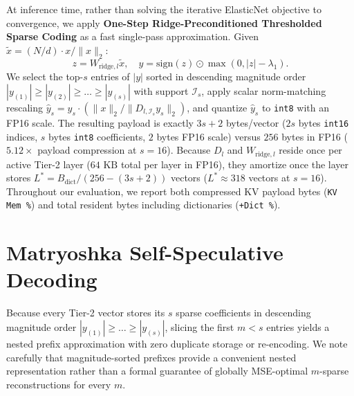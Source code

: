 \documentclass[conference]{IEEEtran}
\begin{document}
At inference time, rather than solving the iterative ElasticNet objective to convergence, we apply \textbf{One-Step Ridge-Preconditioned Thresholded Sparse Coding} as a fast single-pass approximation. Given $\tilde{x} = (N / d)\cdot x / \|x\|_2$:
\begin{equation}
z = W_{\text{ridge}, l}\tilde{x}, \quad y = \text{sign}(z) \odot \max\!\left(0, |z| - \lambda_1\right).
\label{eq:one_step_codec}
\end{equation}
We select the top-$s$ entries of $|y|$ sorted in descending magnitude order $|y_{(1)}| \ge |y_{(2)}| \ge \dots \ge |y_{(s)}|$ with support $\mathcal{I}_s$, apply scalar norm-matching rescaling $\hat{y}_s = y_s \cdot (\|x\|_2 / \|D_{l,\mathcal{I}_s} y_s\|_2)$, and quantize $\hat{y}_s$ to \texttt{int8} with an FP16 scale. The resulting payload is exactly $3s + 2$ bytes/vector ($2s$ bytes \texttt{int16} indices, $s$ bytes \texttt{int8} coefficients, $2$ bytes FP16 scale) versus $256$ bytes in FP16 ($5.12\times$ payload compression at $s = 16$). Because $D_l$ and $W_{\text{ridge},l}$ reside once per active Tier-2 layer ($64\text{ KB}$ total per layer in FP16), they amortize once the layer stores $L^* = B_{\text{dict}} / (256 - (3s + 2))$ vectors ($L^* \approx 318$ vectors at $s = 16$). Throughout our evaluation, we report both compressed KV payload bytes (\texttt{KV Mem \%}) and total resident bytes including dictionaries (\texttt{+Dict \%}).

\section{Matryoshka Self-Speculative Decoding}
Because every Tier-2 vector stores its $s$ sparse coefficients in descending magnitude order $|y_{(1)}| \ge \dots \ge |y_{(s)}|$, slicing the first $m < s$ entries yields a nested prefix approximation \cite{b10} with zero duplicate storage or re-encoding. We note carefully that magnitude-sorted prefixes provide a convenient nested representation rather than a formal guarantee of globally MSE-optimal $m$-sparse reconstructions for every $m$.
\end{document}
